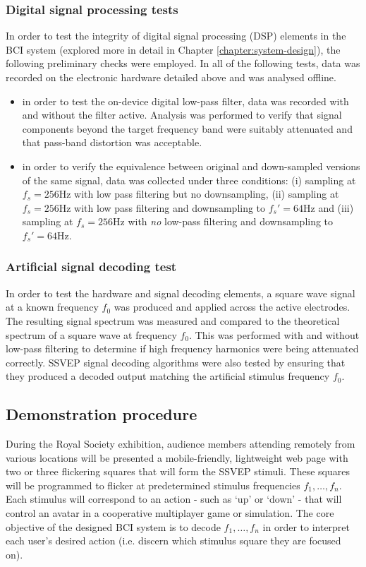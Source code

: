 \subsubsection{Digital signal processing tests}
In order to test the integrity of digital signal processing (DSP) elements in the BCI system (explored more in detail in Chapter \ref{chapter:system-design}), the following preliminary checks were employed. In all of the following tests, data was recorded on the electronic hardware detailed above and was analysed offline.
\begin{itemize}
    \item in order to test the on-device digital low-pass filter, data was recorded with and without the filter active. Analysis was performed to verify that signal components beyond the target frequency band were suitably attenuated and that pass-band distortion was acceptable. 
    \item in order to verify the equivalence between original and down-sampled versions of the same signal, data was collected under three conditions: (i) sampling at $f_s=256$Hz with low pass filtering but no downsampling, (ii) sampling at $f_s=256$Hz with low pass filtering and downsampling to $f_s'=64$Hz and (iii) sampling at $f_s=256$Hz with \textit{no} low-pass filtering and downsampling to $f_s'=64$Hz.
\end{itemize}

\subsubsection{Artificial signal decoding test}
In order to test the hardware and signal decoding elements, a square wave signal at a known frequency $f_0$ was produced and applied across the active electrodes. The resulting signal spectrum was measured and compared to the theoretical spectrum of a square wave at frequency $f_0$. This was performed with and without low-pass filtering to determine if high frequency harmonics were being attenuated correctly. SSVEP signal decoding algorithms were also tested by ensuring that they produced a decoded output matching the artificial stimulus frequency $f_0$.

\subsection{Demonstration procedure}
During the Royal Society exhibition, audience members attending remotely from various locations will be presented a mobile-friendly, lightweight web page with two or three flickering squares that will form the SSVEP stimuli. These squares will be programmed to flicker at predetermined stimulus frequencies $f_1, \dots, f_n$. Each stimulus will correspond to an action - such as `up' or `down' - that will control an avatar in a cooperative multiplayer game or simulation. The core objective of the designed BCI system is to decode $f_1, \dots, f_n$ in order to interpret each user's desired action (i.e. discern which stimulus square they are focused on).